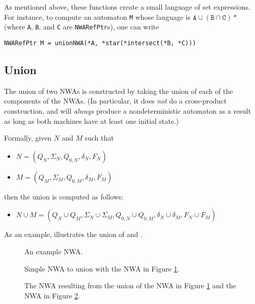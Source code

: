As mentioned above, these functions create a small language of set
expressions. For instance, to compute an automaton \texttt{M} whose language
is $\texttt{A} \cup (\texttt{B} \cap \texttt{C})*$ (where \texttt{A},
\texttt{B}, and \texttt{C} are \texttt{NWARefPtr}s), one can write
\begin{center}
  \texttt{NWARefPtr M = unionNWA(*A, *star(*intersect(*B, *C)))}
\end{center}


\subsection{Union}
\label{Se:Union}
The union of two NWAs is constructed by taking the union of each of the
components of the NWAs. (In
particular, it does \textsl{not} do a cross-product construction, and will
\textsl{always} produce a nondeterministic automaton as a result as long as
both machines have at least one initial state.)

Formally, given $N$ and $M$ such that
\begin{itemize}
 \item $N = (Q_N, \Sigma_N, Q_{0,N}, \delta_N, F_N)$
 \item $M = (Q_M, \Sigma_M, Q_{0,M}, \delta_M, F_M)$
\end{itemize}
then the union is computed as follows:
\begin{itemize}
 \item $N \cup M = (Q_N \cup Q_M, \Sigma_N \cup \Sigma_M, Q_{0,N} \cup
   Q_{0,M}, \delta_N \cup \delta_M, F_N \cup F_M)$
\end{itemize}

As an example,  illustrates the union of  and
.


\begin{figure}[htb]
  \centering
  \caption{An example NWA.}
  \label{Fi:Example1}
\end{figure}


\begin{figure}[htbp]
  \centering
  \caption{Simple NWA to union with the NWA in Figure \ref{Fi:Example1}.}
  \label{Fi:Union1}
\end{figure}

\begin{figure}[htbp]
  \centering
  \caption{The NWA resulting from the union of the NWA in Figure
    \ref{Fi:Example1} and the NWA in Figure \ref{Fi:Union1}.}
  \label{Fi:Union2}
\end{figure}

